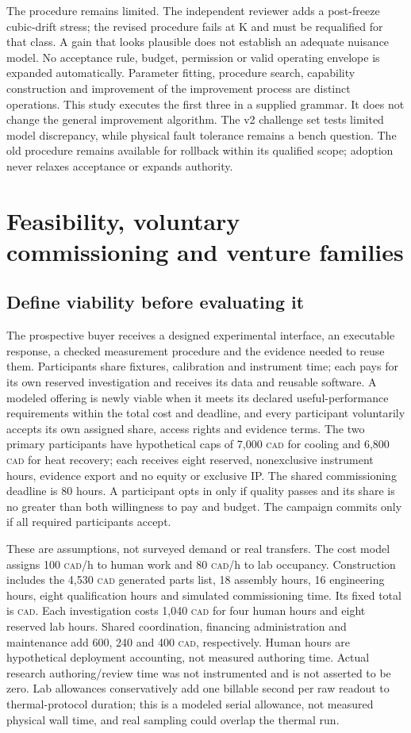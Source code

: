 \documentclass[11pt,letterpaper]{article}
\newcommand{\CAD}{\textsc{cad}}
\begin{document}
The procedure remains limited. The independent reviewer adds a post-freeze cubic-drift stress; the revised procedure fails at \CubicError{} K and must be requalified for that class. A gain that looks plausible does not establish an adequate nuisance model. No acceptance rule, budget, permission or valid operating envelope is expanded automatically. Parameter fitting, procedure search, capability construction and improvement of the improvement process are distinct operations. This study executes the first three in a supplied grammar. It does not change the general improvement algorithm. The v2 challenge set tests limited model discrepancy, while physical fault tolerance remains a bench question. The old procedure remains available for rollback within its qualified scope; adoption never relaxes acceptance or expands authority.

\section{Feasibility, voluntary commissioning and venture families}
\label{sec:economy}
\subsection{Define viability before evaluating it}
The prospective buyer receives a designed experimental interface, an executable response, a checked measurement procedure and the evidence needed to reuse them. Participants share fixtures, calibration and instrument time; each pays for its own reserved investigation and receives its data and reusable software. A modeled offering is newly viable when it meets its declared useful-performance requirements within the total cost and deadline, and every participant voluntarily accepts its own assigned share, access rights and evidence terms. The two primary participants have hypothetical caps of 7,000 \CAD{} for cooling and 6,800 \CAD{} for heat recovery; each receives eight reserved, nonexclusive instrument hours, evidence export and no equity or exclusive IP. The shared commissioning deadline is 80 hours. A participant opts in only if quality passes and its share is no greater than both willingness to pay and budget. The campaign commits only if all required participants accept.

These are assumptions, not surveyed demand or real transfers. The cost model assigns 100 \CAD/h to human work and 80 \CAD/h to lab occupancy. Construction includes the 4,530 \CAD{} generated parts list, 18 assembly hours, 16 engineering hours, eight qualification hours and simulated commissioning time. Its fixed total is \FixedCost{} \CAD. Each investigation costs 1,040 \CAD{} for four human hours and eight reserved lab hours. Shared coordination, financing administration and maintenance add 600, 240 and 400 \CAD{}, respectively. Human hours are hypothetical deployment accounting, not measured authoring time. Actual research authoring/review time was not instrumented and is not asserted to be zero. Lab allowances conservatively add one billable second per raw readout to thermal-protocol duration; this is a modeled serial allowance, not measured physical wall time, and real sampling could overlap the thermal run.
\end{document}
